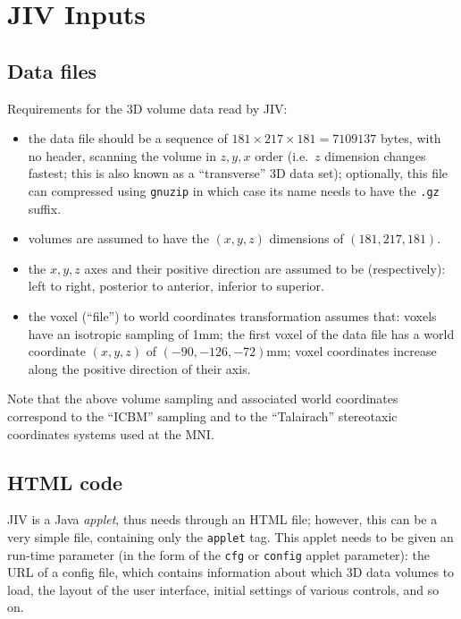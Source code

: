 %
%
%

\section{JIV Inputs}
\label{sec:jiv-inputs}


\subsection{Data files}
\label{sec:data-files}
Requirements for the 3D volume data read by JIV:
\begin{itemize}
\item the data file should be a sequence of $181 \times 217 \times 181
  = 7109137$ bytes, with no header, scanning the volume in $z, y, x$
  order (i.e.\ $z$ dimension changes fastest; this is also known as a
  ``transverse'' 3D data set); optionally, this file can compressed
  using \texttt{gnuzip} in which case its name needs to have the
  \texttt{.gz} suffix.
\item volumes are assumed to have the $(x,y,z)$ dimensions of
  $(181,217,181)$.
\item the $x, y, z$ axes and their positive direction are assumed to
  be (respectively): left to right, posterior to anterior, inferior to
  superior.
\item the voxel (``file'') to world coordinates transformation assumes
  that: voxels have an isotropic sampling of 1mm; the first voxel of
  the data file has a world coordinate $(x,y,z)$ of
  \mbox{$(-90,-126,-72)$mm}; voxel coordinates increase along the
  positive direction of their axis.
\end{itemize}

Note that the above volume sampling and associated world coordinates
correspond to the ``ICBM'' sampling and to the ``Talairach''
stereotaxic coordinates systems used at the MNI.  


\subsection{HTML code}
\label{sec:html-code}

JIV is a Java {\em applet}, thus needs through an HTML file; however,
this can be a very simple file, containing only the \verb+applet+ tag.
This applet needs to be given an run-time parameter (in the form of
the \verb+cfg+ or \verb+config+ applet parameter): the URL of a config
file, which contains information about which 3D data volumes to load,
the layout of the user interface, initial settings of various
controls, and so on.

